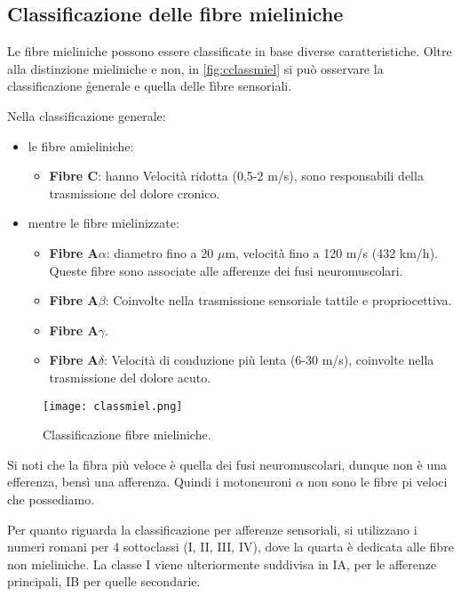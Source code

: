 \subsection{Classificazione delle fibre mieliniche}
Le fibre mieliniche possono essere classificate in base diverse caratteristiche. Oltre alla distinzione mieliniche e non, in \autoref{fig:cclassmiel} si può osservare la classificazione \h{generale} e quella delle \h{fibre sensoriali}.

 Nella classificazione generale:
\begin{itemize}
    \item le fibre amieliniche:
    \begin{itemize}
        \item \textbf{Fibre C}: hanno Velocità ridotta (0,5-2 m/s), sono responsabili della trasmissione del dolore cronico.
    \end{itemize}
    \item mentre le fibre mielinizzate:
    \begin{itemize}
        \item \textbf{Fibre A$\alpha$}: diametro fino a 20 $\mu$m, velocità fino a 120 m/s (432 km/h). Queste fibre sono associate alle afferenze dei fusi neuromuscolari.
        \item \textbf{Fibre A$\beta$}: Coinvolte nella trasmissione sensoriale tattile e propriocettiva.
        \item \textbf{Fibre A$\gamma$}.
        \item \textbf{Fibre A$\delta$}: Velocità di conduzione più lenta (6-30 m/s), coinvolte nella trasmissione del dolore acuto.
    \end{itemize}
\end{itemize}

\begin{figure}[h]
    \centering
    \texttt{[image: classmiel.png]}
    \caption{Classificazione fibre mieliniche.}
    \label{fig:cclassmiel}
\end{figure}

Si noti che la fibra più veloce è quella dei fusi neuromuscolari, dunque non è una efferenza, bensì una afferenza. Quindi i motoneuroni $\alpha$ non sono le fibre pi veloci che possediamo.

Per quanto riguarda la classificazione per afferenze sensoriali, si utilizzano i numeri romani per 4 sottoclassi (I, II, III, IV), dove la quarta è dedicata alle fibre non mieliniche. La classe I viene ulteriormente suddivisa in IA, per le afferenze principali, IB per quelle secondarie.

